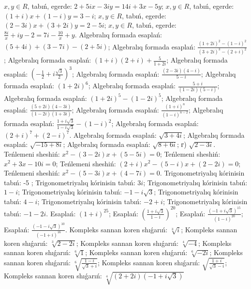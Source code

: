  $x, y \in R$, tabıń, egerde: $2+5 i x-3 i y=14 i+3 x-5 y$;
 $x, y \in R$, tabıń, egerde:  $(1+i) x+(1-i) y=3-i$;
 $x, y \in R$, tabıń, egerde: $(2-3 i) x+(3+2 i) y=2-5 i$;
$x, y \in R$, tabıń, egerde:  $\frac{8 i}{x}+i y-2=7 i-\frac{10}{x}+y$.
Algebralıq formada esaplań: $(5+4 i)+(3-7 i)-(2+5 i)$;
Algebralıq formada esaplań:  $\frac{(1+2 i)^2-(1-i)^2}{(3+2 i)^3-(2+i)^2}$;
Algebralıq formada esaplań:  $(1+i)(2+i)+\frac{5}{1+2 i}$;
Algebralıq formada esaplań:  $\left(-\frac{1}{2}+i \frac{\sqrt{3}}{2}\right)^3$;
Algebralıq formada esaplań: $\frac{(2-3 i)(4-i)}{5-i}$;
Algebralıq formada esaplań: $(1+2 i)^6$;
Algebralıq formada esaplań: $\frac{5+i}{(1-2 i)(5-i)}$;
Algebralıq formada esaplań: $(1+2 i)^5-(1-2 i)^5$;
Algebralıq formada esaplań: $\frac{(5+2 i)(4-3 i)}{(1-2 i)(1+3 i)}$;
Algebralıq formada esaplań: $\frac{(1+i)^n}{(1-i)^{n-2}}$;
Algebralıq formada esaplań: $\frac{1+i \sqrt{3}}{1-i \sqrt{3}}-(1-i)^2$;
Algebralıq formada esaplań: $(2+i)^7+(2-i)^7$.
Algebralıq formada esaplań:  $\sqrt{3+4 i}$;
Algebralıq formada esaplań: $\sqrt{-15+8 i}$;
Algebralıq formada esaplań: $\sqrt{8+6 i}$; г) $\sqrt{2-3 i}$.
Teńlemeni sheshiń:  $x^2-(3-2 i) x+(5-5 i)=0$;
Teńlemeni sheshiń:  $x^2+3 x-10 i=0$;
Teńlemeni sheshiń:  $(2+i) x^2-(5-i) x+(2-2 i)=0$;
Teńlemeni sheshiń:  $x^2-(5-3 i) x+(4-7 i)=0$.
Trigonometriyalıq kórinisin tabıń: -5 ; 
Trigonometriyalıq kórinisin tabıń: $3 i$;
Trigonometriyalıq kórinisin tabıń: $1-i$;
Trigonometriyalıq kórinisin tabıń: $-1-i \sqrt{3}$;
Trigonometriyalıq kórinisin tabıń: $4-i$;
Trigonometriyalıq kórinisin tabıń: $-2+i$;
Trigonometriyalıq kórinisin tabıń: $-1-2 i$.
Esaplań:  $(1+i)^{25}$;
Esaplań:  $\left(\frac{1+i \sqrt{3}}{1-i}\right)^{20}$;
Esaplań:  $\frac{(-1+i \sqrt{3})^{15}}{(1-i)^{20}}$;
Esaplań:  $\frac{(-1-i \sqrt{3})^{10}}{(-1+i)^{16}}$.
Kompleks sannan koren shıǵarıń:  $\sqrt[3]{i}$;
Kompleks sannan koren shıǵarıń: $\sqrt[3]{2-2 i}$;
Kompleks sannan koren shıǵarıń: $\sqrt[4]{-4}$;
Kompleks sannan koren shıǵarıń: $\sqrt[6]{1}$;
Kompleks sannan koren shıǵarıń: $\sqrt[6]{-2 i}$;
Kompleks sannan koren shıǵarıń: $\sqrt[6]{\frac{1-i}{\sqrt{3}+i}}$;
Kompleks sannan koren shıǵarıń: $\sqrt{\frac{1+i}{\sqrt{3}-i}}$;
Kompleks sannan koren shıǵarıń: $\sqrt[4]{(2+2 i)(-1+i \sqrt{3})}$